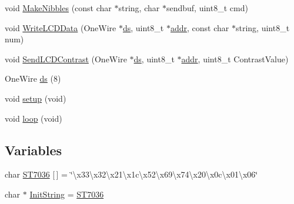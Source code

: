 \begin{DoxyCompactItemize}
\item 
void \hyperlink{backup_2v1_2Uno__DS2408__LCD163_8ino_af4bb4cb579e98255856126016440b6d7}{Make\-Nibbles} (const char $\ast$string, char $\ast$sendbuf, uint8\-\_\-t cmd)
\item 
void \hyperlink{backup_2v1_2Uno__DS2408__LCD163_8ino_aab2d9ea3e3ecace8e6d48c296ec9b622}{Write\-L\-C\-D\-Data} (One\-Wire $\ast$\hyperlink{OWRain1_8ino_af75456870b9486275b406e13b003fb11}{ds}, uint8\-\_\-t $\ast$\hyperlink{OWP__DG__1w-adaptor_8ino_a0fc5da2e63a94559429ec9aec32f1831}{addr}, const char $\ast$string, uint8\-\_\-t num)
\item 
void \hyperlink{backup_2v1_2Uno__DS2408__LCD163_8ino_a7e7f45f7deffa7054df42395788edf9c}{Send\-L\-C\-D\-Contrast} (One\-Wire $\ast$\hyperlink{OWRain1_8ino_af75456870b9486275b406e13b003fb11}{ds}, uint8\-\_\-t $\ast$\hyperlink{OWP__DG__1w-adaptor_8ino_a0fc5da2e63a94559429ec9aec32f1831}{addr}, uint8\-\_\-t Contrast\-Value)
\item 
One\-Wire \hyperlink{backup_2v1_2Uno__DS2408__LCD163_8ino_a7c78cdb37808e2d6d5aaab9ea7aca561}{ds} (8)
\item 
void \hyperlink{backup_2v1_2Uno__DS2408__LCD163_8ino_a7dfd9b79bc5a37d7df40207afbc5431f}{setup} (void)
\item 
void \hyperlink{backup_2v1_2Uno__DS2408__LCD163_8ino_a0b33edabd7f1c4e4a0bf32c67269be2f}{loop} (void)
\end{DoxyCompactItemize}
\subsection*{Variables}
\begin{DoxyCompactItemize}
\item 
char \hyperlink{backup_2v1_2Uno__DS2408__LCD163_8ino_a4db2cbb1ca779c9719d1a0f4d7ba5669}{S\-T7036} \mbox{[}$\,$\mbox{]} = \char`\"{}\textbackslash{}x33\textbackslash{}x32\textbackslash{}x21\textbackslash{}x1c\textbackslash{}x52\textbackslash{}x69\textbackslash{}x74\textbackslash{}x20\textbackslash{}x0c\textbackslash{}x01\textbackslash{}x06\char`\"{}
\item 
char $\ast$ \hyperlink{backup_2v1_2Uno__DS2408__LCD163_8ino_a62481bf733fae27fbf5f83e4a3582c1c}{Init\-String} = \hyperlink{Uno__DS2408__LCD163_8ino_a4db2cbb1ca779c9719d1a0f4d7ba5669}{S\-T7036}
\end{DoxyCompactItemize}


